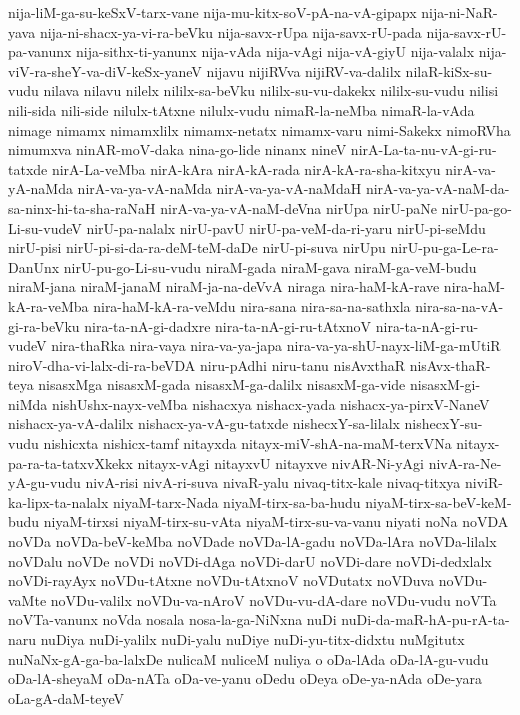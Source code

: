 {nija-liM-ga-su-keSxV-tarx-vane
nija-mu-kitx-soV-pA-na-vA-gipapx
nija-ni-NaR-yava
nija-ni-shacx-ya-vi-ra-beVku
nija-savx-rUpa
nija-savx-rU-pada
nija-savx-rU-pa-vanunx
nija-sithx-ti-yanunx
nija-vAda
nija-vAgi
nija-vA-giyU
nija-valalx
nija-viV-ra-sheY-va-diV-keSx-yaneV
nijavu
nijiRVva
nijiRV-va-dalilx
nilaR-kiSx-su-vudu
nilava
nilavu
nilelx
nililx-sa-beVku
nililx-su-vu-dakekx
nililx-su-vudu
nilisi
nili-sida
nili-side
nilulx-tAtxne
nilulx-vudu
nimaR-la-neMba
nimaR-la-vAda
nimage
nimamx
nimamxlilx
nimamx-netatx
nimamx-varu
nimi-Sakekx
nimoRVha
nimumxva
ninAR-moV-daka
nina-go-lide
ninanx
nineV
nirA-La-ta-nu-vA-gi-ru-tatxde
nirA-La-veMba
nirA-kAra
nirA-kA-rada
nirA-kA-ra-sha-kitxyu
nirA-va-yA-naMda
nirA-va-ya-vA-naMda
nirA-va-ya-vA-naMdaH
nirA-va-ya-vA-naM-da-sa-ninx-hi-ta-sha-raNaH
nirA-va-ya-vA-naM-deVna
nirUpa
nirU-paNe
nirU-pa-go-Li-su-vudeV
nirU-pa-nalalx
nirU-pavU
nirU-pa-veM-da-ri-yaru
nirU-pi-seMdu
nirU-pisi
nirU-pi-si-da-ra-deM-teM-daDe
nirU-pi-suva
nirUpu
nirU-pu-ga-Le-ra-DanUnx
nirU-pu-go-Li-su-vudu
niraM-gada
niraM-gava
niraM-ga-veM-budu
niraM-jana
niraM-janaM
niraM-ja-na-deVvA
niraga
nira-haM-kA-rave
nira-haM-kA-ra-veMba
nira-haM-kA-ra-veMdu
nira-sana
nira-sa-na-sathxla
nira-sa-na-vA-gi-ra-beVku
nira-ta-nA-gi-dadxre
nira-ta-nA-gi-ru-tAtxnoV
nira-ta-nA-gi-ru-vudeV
nira-thaRka
nira-vaya
nira-va-ya-japa
nira-va-ya-shU-nayx-liM-ga-mUtiR
niroV-dha-vi-lalx-di-ra-beVDA
niru-pAdhi
niru-tanu
nisAvxthaR
nisAvx-thaR-teya
nisasxMga
nisasxM-gada
nisasxM-ga-dalilx
nisasxM-ga-vide
nisasxM-gi-niMda
nishUshx-nayx-veMba
nishacxya
nishacx-yada
nishacx-ya-pirxV-NaneV
nishacx-ya-vA-dalilx
nishacx-ya-vA-gu-tatxde
nishecxY-sa-lilalx
nishecxY-su-vudu
nishicxta
nishicx-tamf
nitayxda
nitayx-miV-shA-na-maM-terxVNa
nitayx-pa-ra-ta-tatxvXkekx
nitayx-vAgi
nitayxvU
nitayxve
nivAR-Ni-yAgi
nivA-ra-Ne-yA-gu-vudu
nivA-risi
nivA-ri-suva
nivaR-yalu
nivaq-titx-kale
nivaq-titxya
niviR-ka-lipx-ta-nalalx
niyaM-tarx-Nada
niyaM-tirx-sa-ba-hudu
niyaM-tirx-sa-beV-keM-budu
niyaM-tirxsi
niyaM-tirx-su-vAta
niyaM-tirx-su-va-vanu
niyati
noNa
noVDA
noVDa
noVDa-beV-keMba
noVDade
noVDa-lA-gadu
noVDa-lAra
noVDa-lilalx
noVDalu
noVDe
noVDi
noVDi-dAga
noVDi-darU
noVDi-dare
noVDi-dedxlalx
noVDi-rayAyx
noVDu-tAtxne
noVDu-tAtxnoV
noVDutatx
noVDuva
noVDu-vaMte
noVDu-valilx
noVDu-va-nAroV
noVDu-vu-dA-dare
noVDu-vudu
noVTa
noVTa-vanunx
noVda
nosala
nosa-la-ga-NiNxna
nuDi
nuDi-da-maR-hA-pu-rA-ta-naru
nuDiya
nuDi-yalilx
nuDi-yalu
nuDiye
nuDi-yu-titx-didxtu
nuMgitutx
nuNaNx-gA-ga-ba-lalxDe
nulicaM
nuliceM
nuliya
o
oDa-lAda
oDa-lA-gu-vudu
oDa-lA-sheyaM
oDa-nATa
oDa-ve-yanu
oDedu
oDeya
oDe-ya-nAda
oDe-yara
oLa-gA-daM-teyeV
}
